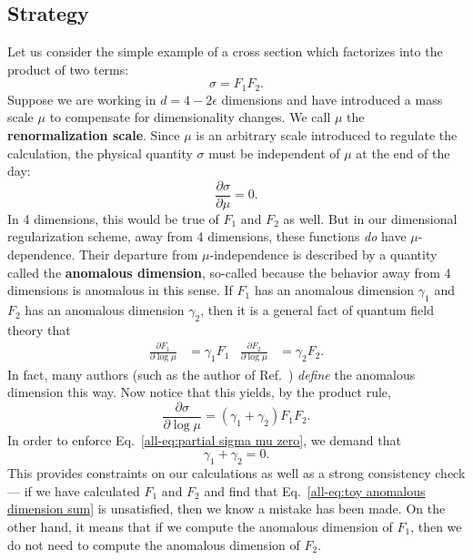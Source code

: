 \documentclass[../thesis.tex]{subfiles}
\begin{document}
\subsection{Strategy}
	Let us consider the simple example of a cross section which factorizes into the product of two terms:
	\begin{equation}
		\sigma = F_1 F_2.
	\end{equation}
	Suppose we are working in $d = 4 - 2\epsilon$ dimensions and have introduced a mass scale $\mu$ to compensate for dimensionality changes. We call $\mu$ the \textbf{renormalization scale}. Since $\mu$ is an arbitrary scale introduced to regulate the calculation, the physical quantity $\sigma$ must be independent of $\mu$ at the end of the day:
	\begin{equation}\label{all-eq:partial sigma mu zero}
		\frac{\partial \sigma}{\partial \mu} = 0.
	\end{equation}
	In 4 dimensions, this would be true of $F_1$ and $F_2$ as well. But in our dimensional regularization scheme, away from 4 dimensions, these functions \textit{do} have $\mu$-dependence. Their departure from $\mu$-independence is described by a quantity called the \textbf{anomalous dimension}, so-called because the behavior away from 4 dimensions is anomalous in this sense. If $F_1$ has an anomalous dimension $\gamma_1$ and $F_2$ has an anomalous dimension $\gamma_2$, then it is a general fact of quantum field theory that \cite{schwartz_quantum_2014}
	\begin{align}\label{all-eq:toy RGE}
		\frac{\partial F_1}{\partial \log \mu} &= \gamma_1 F_1 & \frac{\partial F_2}{\partial \log \mu} &= \gamma_2 F_2.
	\end{align}
	In fact, many authors (such as the author of Ref.~\cite{schwartz_quantum_2014}) \textit{define} the anomalous dimension this way. Now notice that this yields, by the product rule,
	\begin{equation}
		\frac{\partial \sigma}{\partial \log \mu} = (\gamma_1 + \gamma_2) F_1 F_2.
	\end{equation}
	In order to enforce Eq.~\ref{all-eq:partial sigma mu zero}, we demand that
	\begin{equation}\label{all-eq:toy anomalous dimension sum}
		\gamma_1 + \gamma_2 = 0.
	\end{equation}
	This provides constraints on our calculations as well as a strong consistency check --- if we have calculated $F_1$ and $F_2$ and find that Eq.~\ref{all-eq:toy anomalous dimension sum} is unsatisfied, then we know a mistake has been made. On the other hand, it means that if we compute the anomalous dimension of $F_1$, then we do not need to compute the anomalous dimension of $F_2$.
\end{document}
